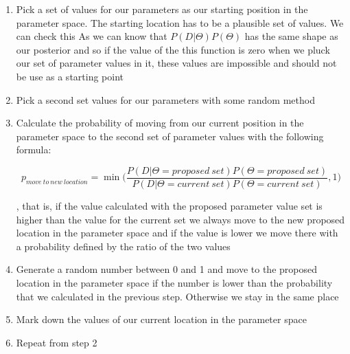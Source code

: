 \documentclass[12pt,a4paper,leqno]{report}
\theoremstyle{plain}
\theoremstyle{definition}
\theoremstyle{remark}
\begin{document}
\begin{enumerate}
    \item Pick a set of values for our parameters as our starting position in the
          parameter space. The starting location has to be a plausible set of values. We
          can check this As we can know that \(P(D|\Theta)P(\Theta)\) has the same shape
          as our posterior and so if the value of the this function is zero when we pluck
          our set of parameter values in it, these values are impossible and should not
          be use as a starting point
    \item Pick a second set values for our parameters with some random method
    \item Calculate the probability of moving from our current position in the parameter
          space to the second set of parameter values with the following formula:

          \begin{def}\label{randomwalk}
              \begin{equation}
                  p_{move\ to\ new\ location} = \min \bigg(\frac{P(D|\Theta = proposed\ set)P(\Theta = proposed\ set)}{P(D|\Theta = current\ set)P(\Theta = current\ set)}, 1 \bigg)
              \end{equation}
          \end{def}
          , that is, if the value calculated with the proposed parameter value set is
          higher than the value for the current set we always move to the new proposed
          location in the parameter space and if the value is lower we move there with a
          probability defined by the ratio of the two values

    \item Generate a random number between 0 and 1 and move to the proposed location in
          the parameter space if the number is lower than the probability that we
          calculated in the previous step. Otherwise we stay in the same place
    \item Mark down the values of our current location in the parameter space
    \item Repeat from step 2

\end{enumerate}
\end{document}
